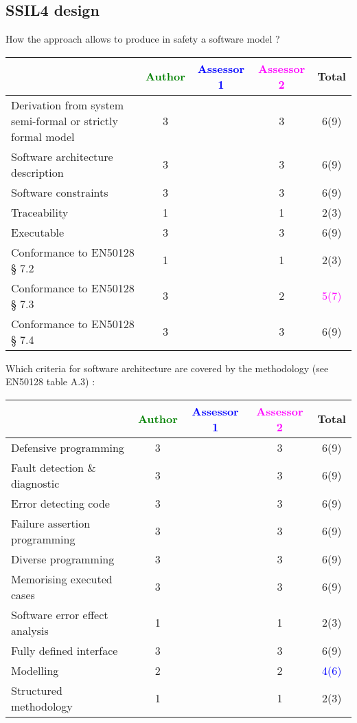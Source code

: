 \subsection{SSIL4 design}

How the approach allows to  produce in safety a software model ?

\begin{tabular}{|l | c | c | c | c|}
\hline
& \textcolor{green}{Author} & \textcolor{blue}{Assessor 1} & \textcolor{magenta}{Assessor 2} & Total \\
\hline
Derivation from system semi-formal or strictly formal model  & 3     & & 3     &  6(9) \\
\hline 
Software architecture description  & 3     & & 3     &  6(9) \\
\hline
Software constraints  & 3     & & 3     &  6(9) \\
\hline
Traceability  & 1     & & 1     &  2(3) \\
\hline
Executable  & 3     & & 3     &  6(9) \\
\hline
Conformance to EN50128 § 7.2  & 1     & & 1     &  2(3) \\
\hline
Conformance to EN50128 § 7.3  & 3     & & 2     & \textcolor{magenta}{5(7)}    \\
\hline
Conformance to EN50128 § 7.4  & 3     & & 3     &  6(9) \\
\hline
\end{tabular}

Which criteria for software architecture are covered by the methodology
(see EN50128 table A.3) :

\begin{tabular}{|l | c | c | c | c|}
\hline
& \textcolor{green}{Author} & \textcolor{blue}{Assessor 1} & \textcolor{magenta}{Assessor 2} & Total \\
\hline
Defensive programming  & 3     & & 3     &  6(9) \\
\hline 
Fault detection \& diagnostic  & 3     & & 3     &  6(9) \\
\hline
Error detecting code  & 3     & & 3     &  6(9) \\
\hline
Failure assertion programming & 3     & & 3     &  6(9) \\
\hline
Diverse programming & 3     & & 3     &  6(9) \\
\hline
Memorising executed cases & 3     & & 3     &  6(9) \\
\hline
Software error effect analysis & 1     & & 1     &  2(3) \\
\hline
Fully defined interface & 3     & & 3     &  6(9) \\
\hline
Modelling  & 2     & & 2    & \textcolor{blue}{4(6)}  \\
\hline
Structured methodology & 1     & & 1     &  2(3) \\
\hline
\end{tabular}

